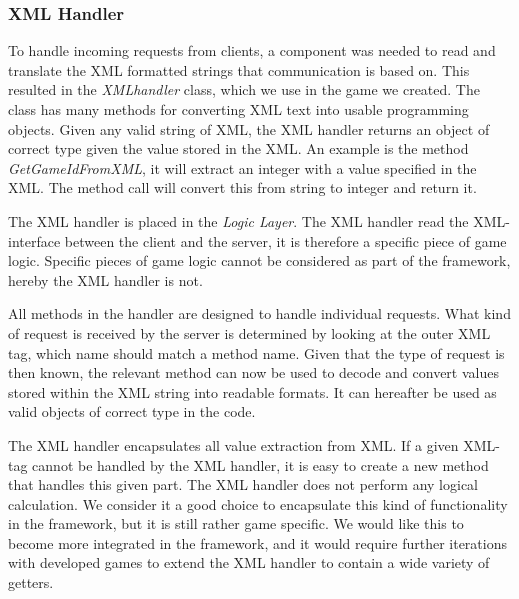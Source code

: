 \subsubsection{XML Handler} \label{sec:xmlhandlerimpl}
To handle incoming requests from clients, a component was needed to read and translate the XML formatted strings that communication is based on. This resulted in the \textit{XMLhandler} class, which we use in the game we created. The class has many methods for converting XML text into usable programming objects. Given any valid string of XML, the XML handler returns an object of correct type given the value stored in the XML. An example is the method \textit{GetGameIdFromXML}, it will extract an integer with a value specified in the XML. The method call will convert this from string to integer and return it. 

The XML handler is placed in the \textit{Logic Layer}. The XML handler read the XML-interface between the client and the server, it is therefore a specific piece of game logic. Specific pieces of game logic cannot be considered as part of the framework, hereby the XML handler is not.

All methods in the handler are designed to handle individual requests. What kind of request is received by the server is determined by looking at the outer XML tag, which name should match a method name. Given that the type of request is then known, the relevant method can now be used to decode and convert values stored within the XML string into readable formats. It can hereafter be used as valid objects of correct type in the code.

The XML handler encapsulates all value extraction from XML. If a given XML-tag cannot be handled by the XML handler, it is easy to create a new method that handles this given part. The XML handler does not perform any logical calculation. We consider it a good choice to encapsulate this kind of functionality in the framework, but it is still rather game specific. We would like this to become more integrated in the framework, and it would require further iterations with developed games to extend the XML handler to contain a wide variety of getters.
